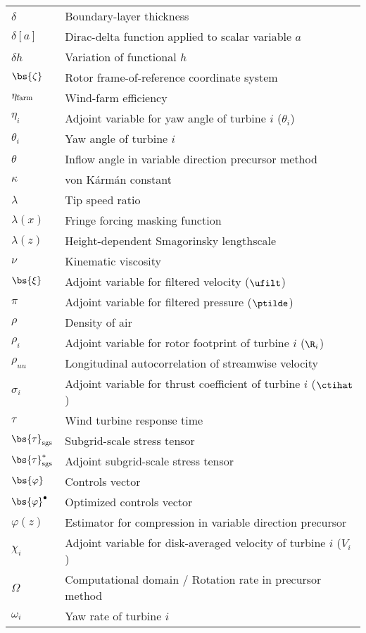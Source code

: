 \begin{tabular}{ p{2cm}  l }
	$\delta$         & Boundary-layer thickness\\
	$\delta[a]$      & Dirac-delta function applied to scalar variable $a$\\
	$\delta h$ 		 & Variation of functional $h$\\
	$\bs{\zeta}$     & Rotor frame-of-reference coordinate system\\
	$\eta_{\rm farm}$& Wind-farm efficiency\\
	$\eta_i$     	 &  Adjoint variable for yaw angle of turbine $i$ ($\theta_i$) \\	
	$\theta_i$       & Yaw angle of turbine $i$\\
	$\theta$         & Inflow angle in variable direction precursor method\\
    $\kappa$		 & von K\'arm\'an constant\\
	$\lambda$ 	     & Tip speed ratio\\
    $\lambda(x)$ 	 & Fringe forcing masking function\\
	$\lambda(z)$     & Height-dependent Smagorinsky lengthscale\\
	$\nu$ 			 & Kinematic viscosity\\
	$\bs{\xi}$ & Adjoint variable for filtered velocity ($\ufilt$)\\
	$\pi$ & Adjoint variable for filtered pressure ($\ptilde$)\\
	$\rho$      &  Density of air \\
	$\rho_i$    &  Adjoint variable for rotor footprint of turbine $i$ ($\R_i$)   \\
	$\rho_{uu}$ &  Longitudinal autocorrelation of streamwise velocity \\
	$\sigma_i$     	 &  Adjoint variable for thrust coefficient of turbine $i$ ($\ctihat$)  \\	
	$\tau$     &     Wind turbine response time\\	
	$\bs{\tau}_{\rm sgs}$     &  Subgrid-scale stress tensor   \\	
	$\bs{\tau}_{\rm sgs}^*$     &  Adjoint subgrid-scale stress tensor   \\	
	$\bs{\varphi}$     &  Controls vector \\
	$\bs{\varphi}^\bullet$     &  Optimized controls vector \\
	$\varphi(z)$ 	 & Estimator for compression in variable direction precursor\\
	$\chi_i$    &  Adjoint variable for disk-averaged velocity of turbine $i$ ($V_i$)   \\
	$\Omega$     &    Computational domain / Rotation rate in precursor method \\	
	$\omega_i$     &    Yaw rate of turbine $i$ \\	
\end{tabular}

